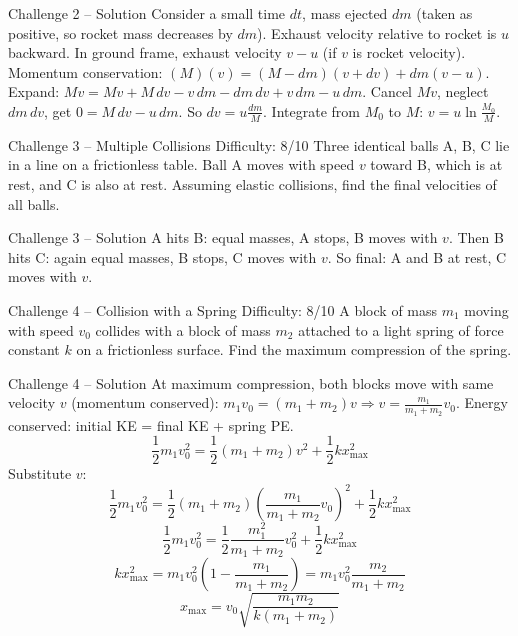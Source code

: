 \documentclass[11pt]{beamer}
\begin{document}
\begin{frame}{Challenge 2 – Solution}
Consider a small time $dt$, mass ejected $dm$ (taken as positive, so rocket mass decreases by $dm$). Exhaust velocity relative to rocket is $u$ backward. In ground frame, exhaust velocity $v - u$ (if $v$ is rocket velocity). Momentum conservation: $(M)(v) = (M-dm)(v+dv) + dm(v-u)$. Expand: $Mv = Mv + M\,dv - v\,dm - dm\,dv + v\,dm - u\,dm$. Cancel $Mv$, neglect $dm\,dv$, get $0 = M\,dv - u\,dm$. So $dv = u \frac{dm}{M}$. Integrate from $M_0$ to $M$: $v = u \ln\frac{M_0}{M}$.
\end{frame}

\begin{frame}[shrink=15]{Challenge 3 – Multiple Collisions \hfill Difficulty: 8/10}
Three identical balls A, B, C lie in a line on a frictionless table. Ball A moves with speed $v$ toward B, which is at rest, and C is also at rest. Assuming elastic collisions, find the final velocities of all balls.
\end{frame}

\begin{frame}{Challenge 3 – Solution}
A hits B: equal masses, A stops, B moves with $v$. Then B hits C: again equal masses, B stops, C moves with $v$. So final: A and B at rest, C moves with $v$.
\end{frame}

\begin{frame}[shrink=15]{Challenge 4 – Collision with a Spring \hfill Difficulty: 8/10}
A block of mass $m_1$ moving with speed $v_0$ collides with a block of mass $m_2$ attached to a light spring of force constant $k$ on a frictionless surface. Find the maximum compression of the spring.
\end{frame}

\begin{frame}{Challenge 4 – Solution}
At maximum compression, both blocks move with same velocity $v$ (momentum conserved): $m_1 v_0 = (m_1+m_2)v \Rightarrow v = \frac{m_1}{m_1+m_2}v_0$.
Energy conserved: initial KE = final KE + spring PE.
\[ \frac12 m_1 v_0^2 = \frac12 (m_1+m_2) v^2 + \frac12 k x_{\max}^2 \]
Substitute $v$:
\[ \frac12 m_1 v_0^2 = \frac12 (m_1+m_2) \left(\frac{m_1}{m_1+m_2}v_0\right)^2 + \frac12 k x_{\max}^2 \]
\[ \frac12 m_1 v_0^2 = \frac12 \frac{m_1^2}{m_1+m_2} v_0^2 + \frac12 k x_{\max}^2 \]
\[ k x_{\max}^2 = m_1 v_0^2 \left(1 - \frac{m_1}{m_1+m_2}\right) = m_1 v_0^2 \frac{m_2}{m_1+m_2} \]
\[ x_{\max} = v_0 \sqrt{\frac{m_1 m_2}{k(m_1+m_2)}} \]
\end{frame}
\end{document}
